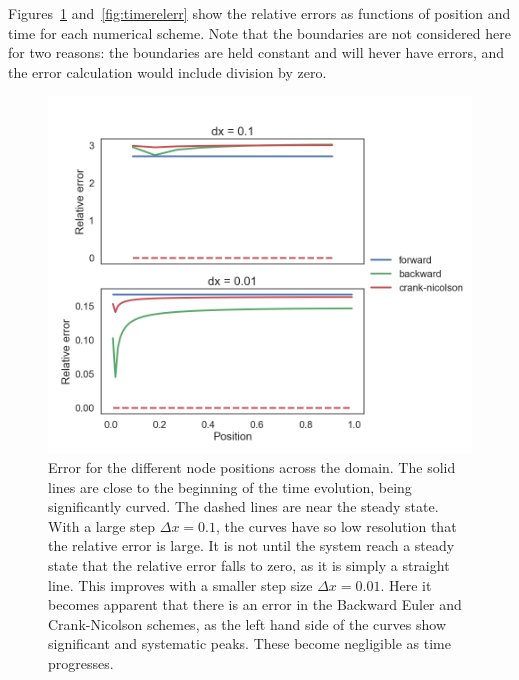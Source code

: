 \documentclass[aps,reprint]{revtex4-1}
\begin{document}
Figures~\ref{fig:posrelerr} and~\ref{fig:timerelerr} show the relative errors as functions
of position and time for each numerical scheme. Note that the boundaries are not considered
here for two reasons: the boundaries are held constant and will hever have errors,
and the error calculation would include division by zero.
\begin{figure}[ht]
  \centering
  \includegraphics[width=\columnwidth]{figures/relative_error_in_position.png}
  \caption{\label{fig:posrelerr} Error for the different node positions across
    the domain. The solid lines are close to the beginning of the time
    evolution, being significantly curved.  The dashed lines are near the steady
    state. With a large step \(\Delta x = 0.1\), the curves have so low resolution
  that the relative error is large. It is not until the system reach a steady
  state that the relative error falls to zero, as it is simply a straight line.
  This improves with a smaller step size \(\Delta x = 0.01\). Here it becomes apparent
that there is an error in the Backward Euler and Crank-Nicolson schemes, as the
left hand side of the curves show significant and systematic peaks. These become
negligible as time progresses.}
\end{figure}
\end{document}
